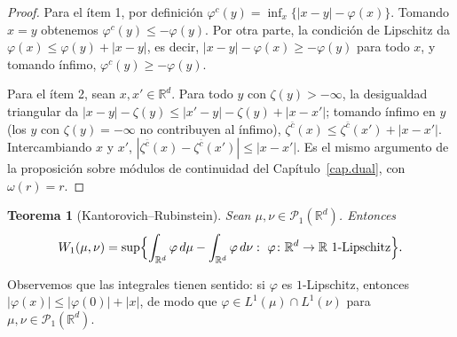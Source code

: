 \documentclass[12pt, a4paper]{amsbook}
\newcommand{\R}{{\mathbb R}}
\newtheorem{teo}{Teorema}[section]
\theoremstyle{remark}
\theoremstyle{definition}
\numberwithin{section}{chapter}
\numberwithin{subsection}{section}
\numberwithin{equation}{section}
\numberwithin{figure}{chapter}
\begin{document}
\begin{proof}
Para el ítem 1, por definición $\varphi^c(y)=\inf_x\{|x-y|-\varphi(x)\}$.
Tomando $x=y$ obtenemos $\varphi^c(y)\le-\varphi(y)$. Por otra parte, la
condición de Lipschitz da $\varphi(x)\le\varphi(y)+|x-y|$, es decir,
$|x-y|-\varphi(x)\ge-\varphi(y)$ para todo $x$, y tomando ínfimo,
$\varphi^c(y)\ge-\varphi(y)$.

Para el ítem 2, sean $x,x'\in\R^d$. Para todo $y$ con $\zeta(y)>-\infty$,
la desigualdad triangular da $|x-y|-\zeta(y)\le|x'-y|-\zeta(y)+|x-x'|$;
tomando ínfimo en $y$ (los $y$ con $\zeta(y)=-\infty$ no contribuyen al
ínfimo), $\zeta^{\bar c}(x)\le\zeta^{\bar c}(x')+|x-x'|$. Intercambiando $x$
y $x'$, $|\zeta^{\bar c}(x)-\zeta^{\bar c}(x')|\le|x-x'|$. Es el mismo
argumento de la proposición sobre módulos de continuidad del
Capítulo~\ref{cap.dual}, con $\omega(r)=r$.
\end{proof}

\begin{teo}[Kantorovich--Rubinstein]\label{teo.KR}
Sean $\mu,\nu\in\mathcal P_1(\R^d)$. Entonces
\[
W_1(\mu,\nu)
=
\sup\Bigl\{\int_{\R^d}\varphi\,d\mu-\int_{\R^d}\varphi\,d\nu:\ \varphi\colon\R^d\to\R\ \text{$1$-Lipschitz}\Bigr\}.
\]
\end{teo}

Observemos que las integrales tienen sentido: si $\varphi$ es $1$-Lipschitz,
entonces $|\varphi(x)|\le|\varphi(0)|+|x|$, de modo que
$\varphi\in L^1(\mu)\cap L^1(\nu)$ para $\mu,\nu\in\mathcal P_1(\R^d)$.
\end{document}
